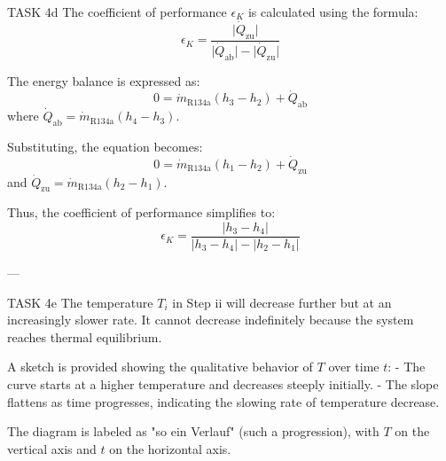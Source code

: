TASK 4d  
The coefficient of performance \( \epsilon_K \) is calculated using the formula:  
\[
\epsilon_K = \frac{\lvert \dot{Q}_{\text{zu}} \rvert}{\lvert \dot{Q}_{\text{ab}} \rvert - \lvert \dot{Q}_{\text{zu}} \rvert}
\]  

The energy balance is expressed as:  
\[
0 = \dot{m}_{\text{R134a}} (h_3 - h_2) + \dot{Q}_{\text{ab}}
\]  
where \( \dot{Q}_{\text{ab}} = \dot{m}_{\text{R134a}} (h_4 - h_3) \).  

Substituting, the equation becomes:  
\[
0 = \dot{m}_{\text{R134a}} (h_1 - h_2) + \dot{Q}_{\text{zu}}
\]  
and \( \dot{Q}_{\text{zu}} = \dot{m}_{\text{R134a}} (h_2 - h_1) \).  

Thus, the coefficient of performance simplifies to:  
\[
\epsilon_K = \frac{\lvert h_3 - h_4 \rvert}{\lvert h_3 - h_4 \rvert - \lvert h_2 - h_1 \rvert}
\]  

---

TASK 4e  
The temperature \( T_i \) in Step ii will decrease further but at an increasingly slower rate. It cannot decrease indefinitely because the system reaches thermal equilibrium.  

A sketch is provided showing the qualitative behavior of \( T \) over time \( t \):  
- The curve starts at a higher temperature and decreases steeply initially.
- The slope flattens as time progresses, indicating the slowing rate of temperature decrease.  

The diagram is labeled as "so ein Verlauf" (such a progression), with \( T \) on the vertical axis and \( t \) on the horizontal axis.
